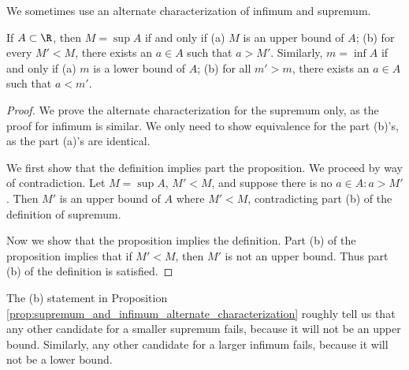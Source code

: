 \documentclass{article} %
\begin{document}
We sometimes use an alternate characterization of infimum and supremum.

\begin{proposition}

If $A \subset \R$, then $M = \sup A$ if and only if (a) $M$ is an upper bound of $A$; (b) for every $M' < M$, there exists an $a \in A$ such that $a>M'$.  Similarly, $m = \inf A$ if and only if (a) $m$ is a lower bound of $A$; (b) for all $m'>m$, there exists an $a \in A$ such that $a<m'$.
\label{prop:supremum_and_infimum_alternate_characterization}
\end{proposition}

\begin{proof}
We prove the alternate characterization for the supremum only, as the proof for infimum is similar.    We only need to show equivalence for the part (b)'s, as the part (a)'s are identical. 

We first show that the definition implies part the proposition.  We proceed by way of contradiction.  Let $M = \sup A$, $M' <M$, and suppose there is no $a \in A : a > M'$. Then $M'$ is an upper bound of $A$ where $M' <M$, contradicting part (b) of the definition of supremum.   

Now we show that the proposition implies the definition. Part (b) of the proposition implies that if $M' < M$, then $M'$ is not an upper bound. Thus part (b) of the definition is satisfied.
\end{proof}



\begin{remark}
The (b) statement in Proposition \ref{prop:supremum_and_infimum_alternate_characterization} roughly tell us that any other candidate for a smaller supremum fails, because it will not be an upper bound.  Similarly, any other candidate for a larger infimum fails, because it will not be a lower bound. 	
\end{remark}
\end{document}
